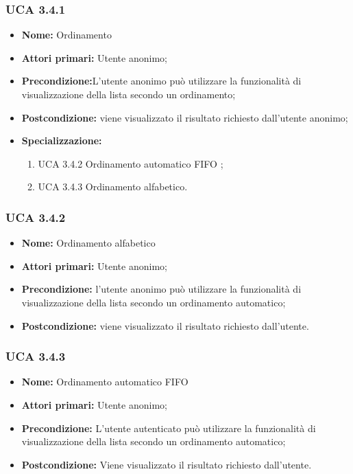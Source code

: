 \subsubsection{UCA 3.4.1}%
\begin{itemize}
	\item \textbf{Nome:} Ordinamento 
	\item \textbf{Attori primari:} Utente anonimo;
	\item \textbf{Precondizione:}L’utente anonimo può utilizzare la funzionalità di visualizzazione della lista secondo un ordinamento;
	\item \textbf{Postcondizione:} viene visualizzato il risultato richiesto dall’utente anonimo;
	\item \textbf{Specializzazione:}
	\begin{enumerate}
		\item UCA 3.4.2 Ordinamento automatico FIFO ;
		\item UCA 3.4.3 Ordinamento alfabetico.
	\end{enumerate}
\end{itemize}

\subsubsection{UCA 3.4.2}%
\begin{itemize}
	\item \textbf{Nome:} Ordinamento alfabetico
	\item \textbf{Attori primari:} Utente anonimo;
	\item \textbf{Precondizione:} l’utente anonimo può utilizzare la funzionalità di visualizzazione della lista secondo un ordinamento automatico;
	\item \textbf{Postcondizione:} viene visualizzato il risultato richiesto dall’utente.
\end{itemize}

\subsubsection{UCA 3.4.3}%
\begin{itemize}
	\item \textbf{Nome:} Ordinamento automatico FIFO	
	\item \textbf{Attori primari:} Utente anonimo;
	\item \textbf{Precondizione:} L’utente autenticato può utilizzare la funzionalità di visualizzazione della lista secondo un ordinamento automatico;
	\item \textbf{Postcondizione:} Viene visualizzato il risultato richiesto dall’utente.
\end{itemize}

